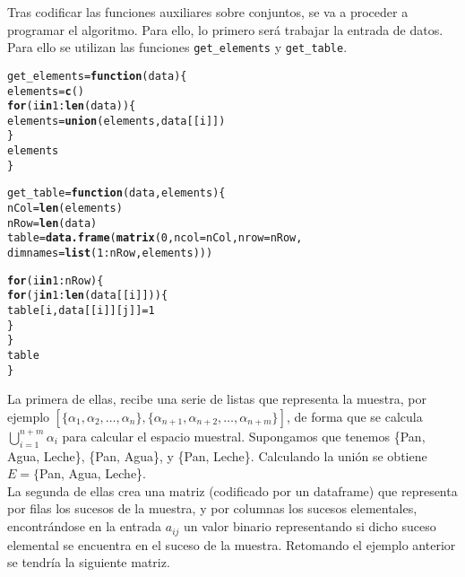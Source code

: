 \documentclass[12pt]{report}\usepackage[]{graphicx}\usepackage[dvipsnames]{xcolor}
\makeatletter
\newcommand{\hlnum}[1]{\textcolor[rgb]{0.686,0.059,0.569}{#1}}%
\newcommand{\hlopt}[1]{\textcolor[rgb]{0,0,0}{#1}}%
\newcommand{\hlstd}[1]{\textcolor[rgb]{0.345,0.345,0.345}{#1}}%
\newcommand{\hlkwa}[1]{\textcolor[rgb]{0.161,0.373,0.58}{\textbf{#1}}}%
\newcommand{\hlkwb}[1]{\textcolor[rgb]{0.69,0.353,0.396}{#1}}%
\newcommand{\hlkwc}[1]{\textcolor[rgb]{0.333,0.667,0.333}{#1}}%
\newcommand{\hlkwd}[1]{\textcolor[rgb]{0.737,0.353,0.396}{\textbf{#1}}}%
\newenvironment{kframe}{%
 \def\at@end@of@kframe{}%
 \ifinner\ifhmode%
  \def\at@end@of@kframe{\end{minipage}}%
  \begin{minipage}{\columnwidth}%
 \fi\fi%
 \def\FrameCommand##1{\hskip\@totalleftmargin \hskip-\fboxsep
 \colorbox{shadecolor}{##1}\hskip-\fboxsep
     \hskip-\linewidth \hskip-\@totalleftmargin \hskip\columnwidth}%
 \MakeFramed {\advance\hsize-\width
   \@totalleftmargin\z@ \linewidth\hsize
   \@setminipage}}%
 {\par\unskip\endMakeFramed%
 \at@end@of@kframe}
\newenvironment{knitrout}{}{} %
\makeatother
\begin{document}
			Tras codificar las funciones auxiliares sobre conjuntos, se va a proceder a programar el algoritmo. Para ello, lo primero será trabajar la entrada de datos. Para ello se utilizan las funciones \texttt{get\_elements} y \texttt{get\_table}. 
			
\begin{knitrout}
\color{fgcolor}\begin{kframe}
\begin{alltt}
\hlstd{get_elements} \hlkwb{=} \hlkwa{function}\hlstd{(}\hlkwc{data}\hlstd{) \{}
        \hlstd{elements} \hlkwb{=} \hlkwd{c}\hlstd{()}
        \hlkwa{for} \hlstd{(i} \hlkwa{in} \hlnum{1}\hlopt{:}\hlkwd{len}\hlstd{(data)) \{}
                \hlstd{elements} \hlkwb{=} \hlkwd{union}\hlstd{(elements, data[[i]])}
        \hlstd{\}}
        \hlstd{elements}
\hlstd{\}}

\hlstd{get_table} \hlkwb{=} \hlkwa{function}\hlstd{(}\hlkwc{data}\hlstd{,} \hlkwc{elements}\hlstd{) \{}
        \hlstd{nCol} \hlkwb{=} \hlkwd{len}\hlstd{(elements)}
        \hlstd{nRow} \hlkwb{=} \hlkwd{len}\hlstd{(data)}
        \hlstd{table} \hlkwb{=} \hlkwd{data.frame}\hlstd{(}\hlkwd{matrix}\hlstd{(}\hlnum{0}\hlstd{,} \hlkwc{ncol} \hlstd{= nCol,} \hlkwc{nrow} \hlstd{= nRow,}
        \hlkwc{dimnames} \hlstd{=} \hlkwd{list}\hlstd{(}\hlnum{1}\hlopt{:}\hlstd{nRow, elements)))}

        \hlkwa{for} \hlstd{(i} \hlkwa{in} \hlnum{1}\hlopt{:}\hlstd{nRow) \{}
                \hlkwa{for} \hlstd{(j} \hlkwa{in} \hlnum{1}\hlopt{:}\hlkwd{len}\hlstd{(data[[i]])) \{}
                        \hlstd{table[i, data[[i]][j]]} \hlkwb{=} \hlnum{1}
                \hlstd{\}}
        \hlstd{\}}
        \hlstd{table}
\hlstd{\}}
\end{alltt}
\end{kframe}
\end{knitrout}
			
			La primera de ellas, recibe una serie de listas que representa la muestra, por ejemplo $[\{\alpha_1, \alpha_2, \ldots, \alpha_n\}, \{\alpha_{n+1}, \alpha_{n+2}, \ldots, \alpha_{n+m}\}]$, de forma que se calcula $\bigcup_{i=1}^{n+m} \alpha_i$ para calcular el espacio muestral. Supongamos que tenemos \{Pan, Agua, Leche\}, \{Pan, Agua\}, y \{Pan, Leche\}. Calculando la unión se obtiene $E = \{$Pan, Agua, Leche\}. \\
			
			La segunda de ellas crea una matriz (codificado por un dataframe) que representa por filas los sucesos de la muestra, y por columnas los sucesos elementales, encontrándose en la entrada $a_{ij}$ un valor binario representando si dicho suceso elemental se encuentra en el suceso de la muestra. Retomando el ejemplo anterior se tendría la siguiente matriz. 
			
\end{document}
